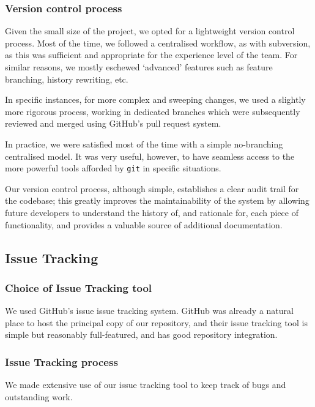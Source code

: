 \subsubsection{Version control process}

Given the small size of the project, we opted for a lightweight
version control process. Most of the time, we followed a centralised
workflow, as with subversion, as this was sufficient and appropriate
for the experience level of the team. For similar reasons, we mostly
eschewed `advanced' features such as feature branching, history
rewriting, etc.

In specific instances, for more complex and sweeping changes, we used
a slightly more rigorous process, working in dedicated branches which
were subsequently reviewed and merged using GitHub's pull request
system\cite{Githubflow}.

In practice, we were satisfied most of the time with a simple
no-branching centralised model. It was very useful, however, to have
seamless access to the more powerful tools afforded by \texttt{git} in
specific situations.

Our version control process, although simple, establishes a clear
audit trail for the codebase; this greatly improves the
maintainability of the system by allowing future developers to
understand the history of, and rationale for, each piece of
functionality, and provides a valuable source of additional
documentation.

\subsection{Issue Tracking}

\subsubsection{Choice of Issue Tracking tool}

We used GitHub's issue issue tracking system. GitHub was already a
natural place to host the principal copy of our repository, and their
issue tracking tool is simple but reasonably full-featured, and
has good repository integration.

\subsubsection{Issue Tracking process}

We made extensive use of our issue tracking tool to keep track of bugs
and outstanding work.

